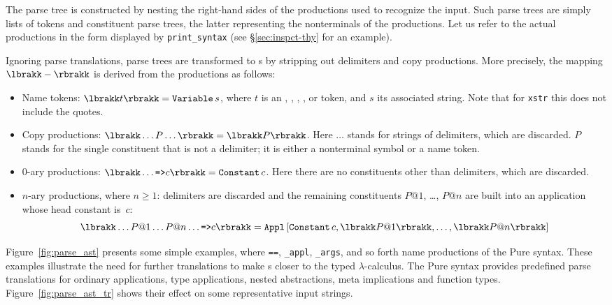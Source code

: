 The parse tree is constructed by nesting the right-hand sides of the
productions used to recognize the input.  Such parse trees are simply lists
of tokens and constituent parse trees, the latter representing the
nonterminals of the productions.  Let us refer to the actual productions in
the form displayed by {\tt print_syntax} (see \S\ref{sec:inspct-thy} for an
example).

Ignoring parse \AST{} translations, parse trees are transformed to \AST{}s
by stripping out delimiters and copy productions.  More precisely, the
mapping $\astofpt{-}$ is derived from the productions as follows:
\begin{itemize}
\item Name tokens: $\astofpt{t} = \Variable s$, where $t$ is an ,
  , , ,  or  token, and $s$
  its associated string. Note that for {\tt xstr} this does not include the
  quotes.

\item Copy productions:
  $\astofpt{\ldots P \ldots} = \astofpt{P}$.  Here $\ldots$ stands for
  strings of delimiters, which are discarded.  $P$ stands for the single
  constituent that is not a delimiter; it is either a nonterminal symbol or
  a name token.

  \item 0-ary productions: $\astofpt{\ldots \mtt{=>} c} = \Constant c$.
    Here there are no constituents other than delimiters, which are
    discarded.

  \item $n$-ary productions, where $n \ge 1$: delimiters are discarded and
    the remaining constituents $P@1$, \ldots, $P@n$ are built into an
    application whose head constant is~$c$:
    \[ \astofpt{\ldots P@1 \ldots P@n \ldots \mtt{=>} c} =
       \Appl{\Constant c, \astofpt{P@1}, \ldots, \astofpt{P@n}}
    \]
\end{itemize}
Figure~\ref{fig:parse_ast} presents some simple examples, where {\tt ==},
{\tt _appl}, {\tt _args}, and so forth name productions of the Pure syntax.
These examples illustrate the need for further translations to make \AST{}s
closer to the typed $\lambda$-calculus.  The Pure syntax provides
predefined parse \AST{} translations for
ordinary applications, type applications, nested abstractions, meta
implications and function types.  Figure~\ref{fig:parse_ast_tr} shows their
effect on some representative input strings.



